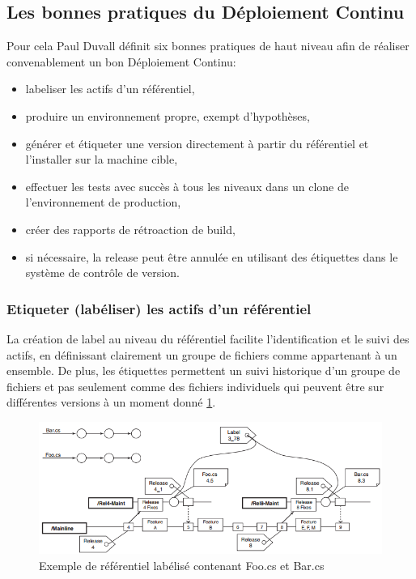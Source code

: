     \subsection{Les bonnes pratiques du Déploiement Continu}
    Pour cela Paul Duvall définit six bonnes pratiques de haut niveau afin de réaliser convenablement un bon Déploiement Continu:\\
    \begin{itemize}
      \item labeliser les actifs d'un référentiel,
      \item produire un environnement propre, exempt d'hypothèses,
      \item générer et étiqueter une version directement à partir du référentiel et l'installer sur la machine cible,
      \item effectuer les tests avec succès à tous les niveaux dans un clone de l'environnement de production,
      \item créer des rapports de rétroaction de build,
      \item	si nécessaire, la release peut être annulée en utilisant des étiquettes dans le système de contrôle de version.\\
    \end{itemize}

      \subsubsection{Etiqueter (labéliser) les actifs d’un référentiel}
      La création de label au niveau du référentiel facilite l'identification et le suivi des actifs, en définissant clairement un groupe de fichiers comme appartenant à un ensemble. De plus, les étiquettes permettent un suivi historique d'un groupe de fichiers et pas seulement comme des fichiers individuels qui peuvent être sur différentes versions à un moment donné \ref{Labels Referential}.

      \begin{figure}
        \begin{center}
          \includegraphics[scale=0.7]{images/Labels.png}
        \end{center}
        \caption{Exemple de référentiel labélisé contenant Foo.cs et Bar.cs}
        \label{Labels Referential}
      \end{figure}

